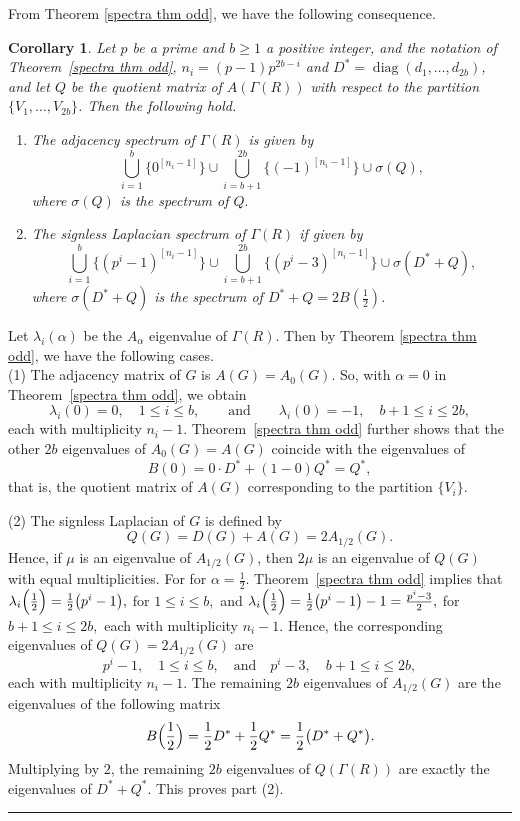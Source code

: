 \documentclass[12pt,twoside]{article}
\renewenvironment{proof}{{\noindent\bfseries Proof.}}{\qed}
\newtheorem{corollary}[theorem]{Corollary}
\def\qed{\nolinebreak\hfill\rule{.2cm}{.2cm}\par\addvspace{.5cm}}
\begin{document}
From Theorem \ref{spectra thm odd}, we have the following consequence.
	\begin{corollary}\label{cor:adj-L-Q-spectra}
		Let $p$ be a prime and $b\ge 1$ a positive integer, and the notation of
		Theorem~\ref{spectra thm odd},	$n_i=(p-1)p^{ 2b-i}$ and $D^\ast=\operatorname{diag}(d_1,\dots,d_{2b})$,
		and let $Q$ be the quotient matrix of $A( \varGamma(R))$ with respect to
		the partition $\{V_1,\dots,V_{2b}\}$.
		Then the following hold.
		\begin{enumerate}
			\item The adjacency spectrum of $ \varGamma(R)$ is given by
			\[
		\bigcup_{i=1}^{b}\{0^{[n_i-1]}\}
			\cup
			\bigcup_{i=b+1}^{2b}\{(-1)^{[n_i-1]}\}
			\cup\sigma(Q),
			\]
			where $\sigma(Q)$ is the spectrum of $Q.$
			
			\item The signless Laplacian spectrum of $ \varGamma(R)$ if given by
			\[
			\bigcup_{i=1}^{b}\{(p^{ i}-1)^{[n_i-1]}\}
			\cup
			\bigcup_{i=b+1}^{2b}\{(p^{ i}-3)^{[n_i-1]}\}
			\cup\sigma(D^\ast+Q),
			\]
			where $\sigma(D^\ast+Q)$ is the spectrum of  $D^\ast+Q=2B\!\left(\tfrac12\right)$.
		\end{enumerate}
	\end{corollary}
	\begin{proof} Let $\lambda_{i}(\alpha)$ be the $A_{\alpha}$ eigenvalue of $ \varGamma(R)$. Then by Theorem \ref{spectra thm odd}, we have the following cases.\\ 
		(1) The adjacency matrix of $G$ is $A(G)=A_0(G)$. So, with $\alpha=0$ in Theorem~\ref{spectra thm odd}, we obtain
		\[
		\lambda_i(0)=0,\quad 1\le i\le b,\qquad\text{and}\qquad
		\lambda_i(0)=-1,\quad b+1\le i\le 2b,
		\]
		each with multiplicity $n_i-1$. Theorem~\ref{spectra thm odd} further shows that the other \(2b\) eigenvalues of \(A_0(G)=A(G)\) coincide with the eigenvalues of  
		\[
		B(0)=0\cdot D^{\ast}+(1-0)Q^{\ast}=Q^{\ast},
		\]
		that is, the quotient matrix of \(A(G)\) corresponding to the partition \(\{V_i\}\).
		
		\medskip
		
		\noindent
		(2) The signless Laplacian of \(G\) is defined by
		\[
		Q(G)=D(G)+A(G)=2A_{1/2}(G).
		\]
		Hence, if \(\mu\) is an eigenvalue of \(A_{1/2}(G)\), then \(2\mu\) is an eigenvalue of \(Q(G)\) with equal multiplicities. 
		For for $\alpha=\tfrac12$. Theorem~\ref{spectra thm odd} implies that
		 $\lambda_i\Bigl(\frac12\Bigr) = \tfrac12\bigl(p^{ i}-1\bigr),$ for $1\le i\le b,$ and 
		$\lambda_i\Bigl(\frac12\Bigr) = \tfrac12\bigl(p^{ i}-1\bigr)-1 = \tfrac{p^{ i}-3}{2},$ for $b+1\le i\le 2b,$ 	each with multiplicity $n_i-1$. 
		Hence, the corresponding eigenvalues of $Q(G)=2A_{1/2}(G)$ are
		\[
		p^{ i}-1,\quad 1\le i\le b,\quad\text{and}\quad
		p^{ i}-3,\quad b+1\le i\le 2b,
		\]
		each with multiplicity $n_i-1$.	The remaining $2b$ eigenvalues of $A_{1/2}(G)$ are the eigenvalues of the following matrix
		\[
		B\Bigl(\frac12\Bigr) = \frac12 D^\ast + \frac12 Q^\ast
		= \frac12\bigl(D^\ast+Q^\ast\bigr).
		\]
		Multiplying by $2$, the remaining $2b$ eigenvalues of $Q( \varGamma(R))$ are exactly the eigenvalues of $D^\ast+Q^\ast$. This proves part (2).
	\end{proof}
	
\end{document}

